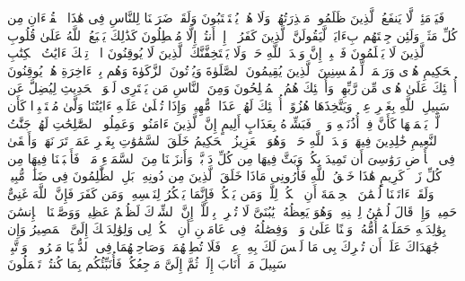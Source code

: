 \stopbuffer%
\startbuffer[\q:30:57]
فَیَوۡمَئِذࣲ لَّا یَنفَعُ ٱلَّذِینَ ظَلَمُوا۟ مَعۡذِرَتُهُمۡ وَلَا هُمۡ یُسۡتَعۡتَبُونَ%
\stopbuffer%
\startbuffer[\q:30:58]
وَلَقَدۡ ضَرَبۡنَا لِلنَّاسِ فِی هَٰذَا ٱلۡقُرۡءَانِ مِن كُلِّ مَثَلࣲۚ وَلَئِن جِئۡتَهُم بِءَایَةࣲ لَّیَقُولَنَّ ٱلَّذِینَ كَفَرُوۤا۟ إِنۡ أَنتُمۡ إِلَّا مُبۡطِلُونَ%
\stopbuffer%
\startbuffer[\q:30:59]
كَذَٰلِكَ یَطۡبَعُ ٱللَّهُ عَلَىٰ قُلُوبِ ٱلَّذِینَ لَا یَعۡلَمُونَ%
\stopbuffer%
\startbuffer[\q:30:60]
فَٱصۡبِرۡ إِنَّ وَعۡدَ ٱللَّهِ حَقࣱّۖ وَلَا یَسۡتَخِفَّنَّكَ ٱلَّذِینَ لَا یُوقِنُونَ%
\stopbuffer%
\startbuffer[\q:31:1]
الۤمۤ%
\stopbuffer%
\startbuffer[\q:31:2]
تِلۡكَ ءَایَٰتُ ٱلۡكِتَٰبِ ٱلۡحَكِیمِ%
\stopbuffer%
\startbuffer[\q:31:3]
هُدࣰى وَرَحۡمَةࣰ لِّلۡمُحۡسِنِینَ%
\stopbuffer%
\startbuffer[\q:31:4]
ٱلَّذِینَ یُقِیمُونَ ٱلصَّلَوٰةَ وَیُؤۡتُونَ ٱلزَّكَوٰةَ وَهُم بِٱلۡءَاخِرَةِ هُمۡ یُوقِنُونَ%
\stopbuffer%
\startbuffer[\q:31:5]
أُو۟لَٰۤئِكَ عَلَىٰ هُدࣰى مِّن رَّبِّهِمۡۖ وَأُو۟لَٰۤئِكَ هُمُ ٱلۡمُفۡلِحُونَ%
\stopbuffer%
\startbuffer[\q:31:6]
وَمِنَ ٱلنَّاسِ مَن یَشۡتَرِی لَهۡوَ ٱلۡحَدِیثِ لِیُضِلَّ عَن سَبِیلِ ٱللَّهِ بِغَیۡرِ عِلۡمࣲ وَیَتَّخِذَهَا هُزُوًاۚ أُو۟لَٰۤئِكَ لَهُمۡ عَذَابࣱ مُّهِینࣱ%
\stopbuffer%
\startbuffer[\q:31:7]
وَإِذَا تُتۡلَىٰ عَلَیۡهِ ءَایَٰتُنَا وَلَّىٰ مُسۡتَكۡبِرࣰا كَأَن لَّمۡ یَسۡمَعۡهَا كَأَنَّ فِیۤ أُذُنَیۡهِ وَقۡرࣰاۖ فَبَشِّرۡهُ بِعَذَابٍ أَلِیمٍ%
\stopbuffer%
\startbuffer[\q:31:8]
إِنَّ ٱلَّذِینَ ءَامَنُوا۟ وَعَمِلُوا۟ ٱلصَّٰلِحَٰتِ لَهُمۡ جَنَّٰتُ ٱلنَّعِیمِ%
\stopbuffer%
\startbuffer[\q:31:9]
خَٰلِدِینَ فِیهَاۖ وَعۡدَ ٱللَّهِ حَقࣰّاۚ وَهُوَ ٱلۡعَزِیزُ ٱلۡحَكِیمُ%
\stopbuffer%
\startbuffer[\q:31:10]
خَلَقَ ٱلسَّمَٰوَٰتِ بِغَیۡرِ عَمَدࣲ تَرَوۡنَهَاۖ وَأَلۡقَىٰ فِی ٱلۡأَرۡضِ رَوَٰسِیَ أَن تَمِیدَ بِكُمۡ وَبَثَّ فِیهَا مِن كُلِّ دَاۤبَّةࣲۚ وَأَنزَلۡنَا مِنَ ٱلسَّمَاۤءِ مَاۤءࣰ فَأَنۢبَتۡنَا فِیهَا مِن كُلِّ زَوۡجࣲ كَرِیمٍ%
\stopbuffer%
\startbuffer[\q:31:11]
هَٰذَا خَلۡقُ ٱللَّهِ فَأَرُونِی مَاذَا خَلَقَ ٱلَّذِینَ مِن دُونِهِۦۚ بَلِ ٱلظَّٰلِمُونَ فِی ضَلَٰلࣲ مُّبِینࣲ%
\stopbuffer%
\startbuffer[\q:31:12]
وَلَقَدۡ ءَاتَیۡنَا لُقۡمَٰنَ ٱلۡحِكۡمَةَ أَنِ ٱشۡكُرۡ لِلَّهِۚ وَمَن یَشۡكُرۡ فَإِنَّمَا یَشۡكُرُ لِنَفۡسِهِۦۖ وَمَن كَفَرَ فَإِنَّ ٱللَّهَ غَنِیٌّ حَمِیدࣱ%
\stopbuffer%
\startbuffer[\q:31:13]
وَإِذۡ قَالَ لُقۡمَٰنُ لِٱبۡنِهِۦ وَهُوَ یَعِظُهُۥ یَٰبُنَیَّ لَا تُشۡرِكۡ بِٱللَّهِۖ إِنَّ ٱلشِّرۡكَ لَظُلۡمٌ عَظِیمࣱ%
\stopbuffer%
\startbuffer[\q:31:14]
وَوَصَّیۡنَا ٱلۡإِنسَٰنَ بِوَٰلِدَیۡهِ حَمَلَتۡهُ أُمُّهُۥ وَهۡنًا عَلَىٰ وَهۡنࣲ وَفِصَٰلُهُۥ فِی عَامَیۡنِ أَنِ ٱشۡكُرۡ لِی وَلِوَٰلِدَیۡكَ إِلَیَّ ٱلۡمَصِیرُ%
\stopbuffer%
\startbuffer[\q:31:15]
وَإِن جَٰهَدَاكَ عَلَىٰۤ أَن تُشۡرِكَ بِی مَا لَیۡسَ لَكَ بِهِۦ عِلۡمࣱ فَلَا تُطِعۡهُمَاۖ وَصَاحِبۡهُمَا فِی ٱلدُّنۡیَا مَعۡرُوفࣰاۖ وَٱتَّبِعۡ سَبِیلَ مَنۡ أَنَابَ إِلَیَّۚ ثُمَّ إِلَیَّ مَرۡجِعُكُمۡ فَأُنَبِّئُكُم بِمَا كُنتُمۡ تَعۡمَلُونَ%
